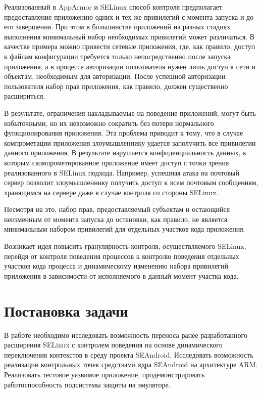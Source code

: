 Реализованный в AppArmor и SELinux способ контроля предполагает
предоставление приложению одних и тех же привилегий с момента
запуска и до его завершения. При этом в большинстве приложений
на разных стадиях выполнения минимальный набор необходимых
привилегий может различаться. В качестве примера можно привести
сетевые приложения, где, как правило, доступ к файлам конфигурации
требуется только непосредственно после запуска приложения,
а в процессе авторизации пользователя нужен лишь доступ к сети и
объектам, необходимым для авторизации. После успешной авторизации
пользователя набор прав приложения, как правило, должен существенно
расшириться.

В результате, ограничения накладываемые на поведение приложений,
могут быть избыточными, но их невозможно сократить без потери
нормального функционирования приложения. Эта проблема приводит
к тому, что в случае компрометации приложения злоумышленнику удается
заполучить все привилегии данного приложения. В результате нарушается
конфиденциальность данных, к которым скомпрометированное приложение
имеет доступ с точки зрения реализованного в SELinux подхода.
Например, успешная атака на почтовый сервер позволит злоумышленнику
получить доступ к всем почтовым сообщениям, хранящимся на сервере даже
в случае контроля со стороны SELinux.

Несмотря на это, набор прав, предоставляемый субъектам 
и остающийся неизменным от момента запуска до остановки,
как правило, не является минимальным набором привилегий
для отдельных участков кода приложения.

Возникает идея повысить гранулярность контроля,
осуществляемого SELinux, перейдя от контроля поведения процессов
к контролю поведения отдельных участков кода процесса и
динамическому изменению набора привилегий приложения в зависимости
от исполняемого в данный момент участка кода.
 
\newpage
\section{Постановка задачи}
\begin{comment}
\subsection{Расшифровка темы}
\end{comment}

В работе необходимо исследовать возможность переноса ранее
разработанного расширения SELinux с контролем поведения на основе
динамического переключения контекстов в среду проекта SEAndroid.
Исследовать возможность реализации контрольных точек средствами ядра
SEAndroid на архитектуре ARM. Реализовать тестовое уязвимое приложение,
продемонстрировать работоспособность подсистемы защиты на эмуляторе.

